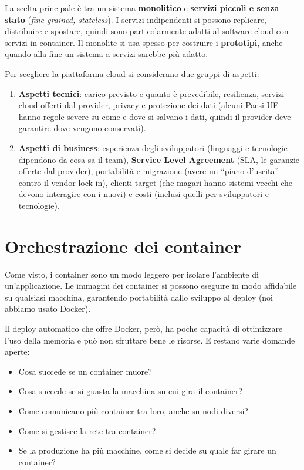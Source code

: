 La scelta principale è tra un sistema \textbf{monolitico} e
\textbf{servizi piccoli e senza stato} (\emph{fine-grained, stateless}).
I servizi indipendenti si possono replicare, distribuire e spostare,
quindi sono particolarmente adatti al software cloud con servizi in
container. Il monolite si usa spesso per costruire i \textbf{prototipi},
anche quando alla fine un sistema a servizi sarebbe più adatto.

Per scegliere la piattaforma cloud si considerano due gruppi di aspetti:

\begin{enumerate}
\def\labelenumi{\arabic{enumi}.}
\tightlist
\item
  \textbf{Aspetti tecnici}: carico previsto e quanto è prevedibile,
  resilienza, servizi cloud offerti dal provider, privacy e protezione
  dei dati (alcuni Paesi UE hanno regole severe su come e dove si
  salvano i dati, quindi il provider deve garantire dove vengono
  conservati).
\item
  \textbf{Aspetti di business}: esperienza degli sviluppatori (linguaggi
  e tecnologie dipendono da cosa sa il team), \textbf{Service Level
  Agreement} (SLA, le garanzie offerte dal provider), portabilità e
  migrazione (avere un ``piano d'uscita'' contro il vendor lock-in),
  clienti target (che magari hanno sistemi vecchi che devono interagire
  con i nuovi) e costi (inclusi quelli per sviluppatori e tecnologie).
\end{enumerate}

\section{Orchestrazione dei
container}\label{orchestrazione-dei-container}

Come visto, i container sono un modo leggero per isolare l'ambiente di
un'applicazione. Le immagini dei container si possono eseguire in modo
affidabile su qualsiasi macchina, garantendo portabilità dallo sviluppo
al deploy (noi abbiamo usato Docker).

Il deploy automatico che offre Docker, però, ha poche capacità di
ottimizzare l'uso della memoria e può non sfruttare bene le risorse. E
restano varie domande aperte:

\begin{itemize}
\tightlist
\item
  Cosa succede se un container muore?
\item
  Cosa succede se si guasta la macchina su cui gira il container?
\item
  Come comunicano più container tra loro, anche su nodi diversi?
\item
  Come si gestisce la rete tra container?
\item
  Se la produzione ha più macchine, come si decide su quale far girare
  un container?
\end{itemize}

